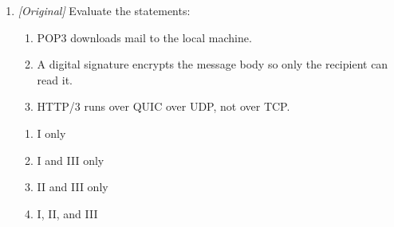 \begin{enumerate}[label=\textbf{Q\arabic*.}, leftmargin=*]
\begin{enumerate}[label=\Alph*.]
    \item A physical port is a service number; a logical port is a hardware socket.
    \item Both are hardware sockets for cables.
    \item A physical port is a hardware socket; a logical port is a number
      identifying a service or process.
    \item Both are numbers identifying a service or process.
  \end{enumerate}
\item \textit{[Original]} Evaluate the statements:
  \begin{enumerate}[label=\Roman*.]
    \item POP3 downloads mail to the local machine.
    \item A digital signature encrypts the message body so only the recipient can read it.
    \item HTTP/3 runs over QUIC over UDP, not over TCP.
  \end{enumerate}
  \begin{enumerate}[label=\Alph*.]
    \item I only
    \item I and III only
    \item II and III only
    \item I, II, and III
  \end{enumerate}


\end{enumerate}
